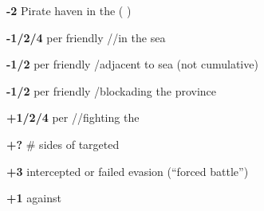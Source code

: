 {{\begin{modlist}
    \item[\bf -2] Pirate haven in the \STZ ( \corsaire)
    \item[\bf -1/2/4] per friendly \ND/\FLEET\facemoins/\FLEET\faceplus in the
      sea
    \item[\bf -1/2] per friendly \FLEET\facemoins/\FLEET\faceplus adjacent to
      sea (not cumulative)
    \item[\bf -1/2] per friendly \FLEET\facemoins/\FLEET\faceplus blockading the
      province
    \item[\bf +1/2/4] per \ND/\FLEET\facemoins/\FLEET\faceplus fighting the
      \corsaire
    \item[\bf +?] \# sides of \TradeFLEET targeted
    \item[\bf +3] \corsaire intercepted or failed evasion (``forced battle'')
    \item[\bf +1] against 
    \end{modlist}
  }
  \GTdecorate
}


\newcommand{\peaceconditionsminor}{
  \GT{peaceconditionsminor}{Specific conditions for peace with Minors}
  \GTtextcontent[eastpoint]{
    \tablenarrow{\vspace*{2ex}\\}
    \GTitem{Minor monarch ransom is 50\ducats \textbf{or} bonus to peace
      proposal \textbf{or} allowing separate peace.}
    \GTitem{1 proposal per alliance, plus separate peace to minors
      either at war by event or with at least 1 province occupied (by
      or on the minor).}
    \GTitem{No separate peace against \VASSAL or \ANNEXION unless
      either Capital occupied or monarch captured (instead of
      ransom).}
    \GTitem{Minors always accept global white peace in \terme{Overseas
        wars}.}
    \GTitem{Maximum indemnity is 4 times total provinces income.}
    \GTitem{Forced diplomacy: 1 cond. for \RM, 2 for \MA and 3 for \VASSAL.}
    \GTitem{Minor always accept unconditional victory if either
      attacking by event or global peace.}
    \GTitem{If all provinces are occupied, mandatory unconditional
      surrender against \textbf{all} opponents simultaneously.}
    \GTitem{Goes to \Neutral after unconditional surrender or if
      allies \textbf{choses} to give minor territory.}
  }
  \GTtextdecorate
}

